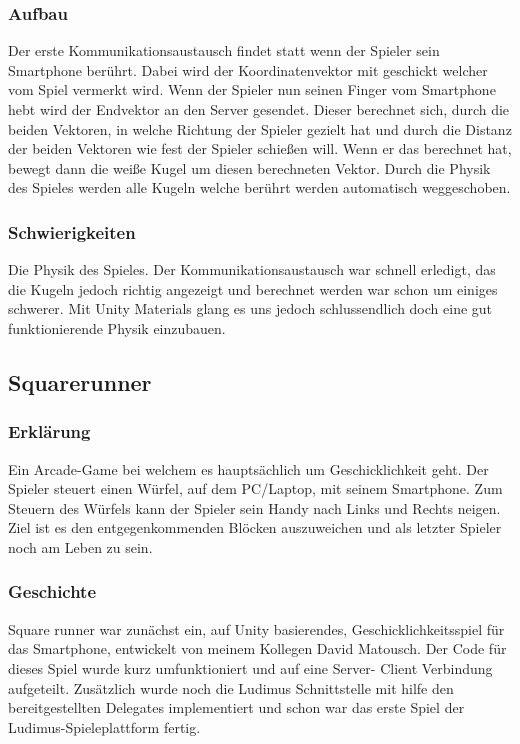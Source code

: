 \subsubsection{Aufbau}
Der erste Kommunikationsaustausch findet statt wenn der Spieler sein Smartphone berührt. Dabei wird der Koordinatenvektor mit geschickt welcher vom Spiel vermerkt wird. Wenn der Spieler nun seinen Finger vom Smartphone hebt wird der Endvektor an den Server gesendet. Dieser berechnet sich, durch die beiden Vektoren, in welche Richtung der Spieler gezielt hat und durch die Distanz der beiden Vektoren wie fest der Spieler schießen will. Wenn er das berechnet hat, bewegt dann die weiße Kugel um diesen berechneten Vektor. Durch die Physik des Spieles werden alle Kugeln welche berührt werden automatisch weggeschoben.
\subsubsection{Schwierigkeiten}
Die Physik des Spieles. Der Kommunikationsaustausch war schnell erledigt, das die Kugeln jedoch richtig angezeigt und berechnet werden war schon um einiges schwerer. Mit Unity Materials glang es uns jedoch schlussendlich doch eine gut funktionierende Physik einzubauen.
\subsection{Squarerunner}
\subsubsection{Erklärung}
Ein Arcade-Game bei welchem es hauptsächlich um Geschicklichkeit geht. Der Spieler steuert einen Würfel, auf dem PC/Laptop, mit seinem Smartphone. Zum Steuern des Würfels kann der Spieler sein Handy nach Links und Rechts neigen. Ziel ist es den entgegenkommenden Blöcken auszuweichen und als letzter Spieler noch am Leben zu sein.
\subsubsection{Geschichte}
Square runner war zunächst ein, auf Unity basierendes, Geschicklichkeitsspiel für das Smartphone, entwickelt von meinem Kollegen David Matousch. Der Code für dieses Spiel wurde kurz umfunktioniert und auf eine Server- Client Verbindung aufgeteilt. Zusätzlich wurde noch die Ludimus Schnittstelle mit hilfe den bereitgestellten Delegates implementiert und schon war das erste Spiel der Ludimus-Spieleplattform fertig.
